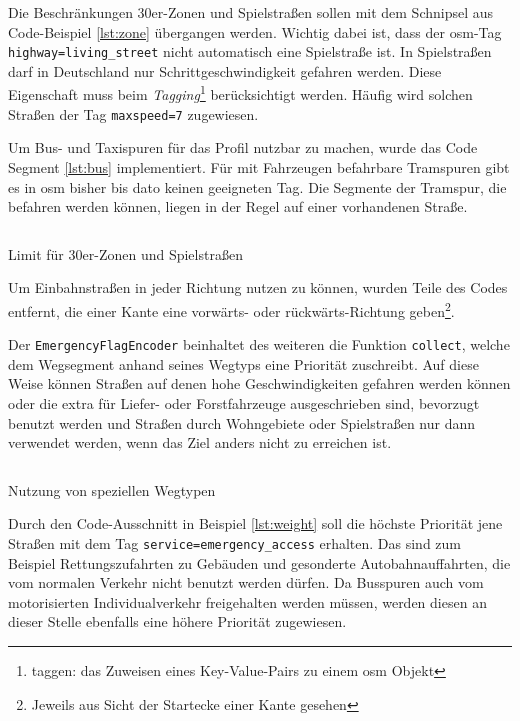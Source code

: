 Die Beschränkungen 30er-Zonen und Spielstraßen sollen mit dem Schnipsel aus Code-Beispiel \ref{lst:zone} übergangen werden.
Wichtig dabei ist, dass der \gls{osm}-Tag \texttt{highway=living\_street} nicht automatisch eine Spielstraße ist.
In Spielstraßen darf in Deutschland nur Schrittgeschwindigkeit gefahren werden.
Diese Eigenschaft muss beim \textit{Tagging}\footnote{taggen: das Zuweisen eines Key-Value-Pairs zu einem \gls{osm} Objekt} berücksichtigt werden.
Häufig wird solchen Straßen der Tag \texttt{maxspeed=7} zugewiesen.


Um Bus- und Taxispuren für das Profil nutzbar zu machen, wurde das Code Segment \ref{lst:bus} implementiert.
Für mit Fahrzeugen befahrbare Tramspuren gibt es in \gls{osm} bisher bis dato keinen geeigneten Tag.
Die Segmente der Tramspur, die befahren werden können, liegen in der Regel auf einer vorhandenen Straße.
\begin{listing}[htb]
\centering
{}
\inputminted[gobble=2, fontsize=\footnotesize, breaklines=true, breakbytoken=|, firstline=299, lastline=303]{java}{../data/JavaFiles/EmergencyFlagEncoder.java}
\caption{Limit für 30er-Zonen und Spielstraßen}
\label{lst:zone}
\end{listing}

Um Einbahnstraßen in jeder Richtung nutzen zu können, wurden Teile des Codes entfernt, die einer Kante eine vorwärts- oder rückwärts-Richtung geben\footnote{Jeweils aus Sicht der Startecke einer Kante gesehen}.

Der \texttt{EmergencyFlagEncoder} beinhaltet des weiteren die Funktion \texttt{collect}, welche dem Wegsegment anhand seines Wegtyps eine Priorität zuschreibt.
Auf diese Weise können Straßen auf denen hohe Geschwindigkeiten gefahren werden können oder die extra für Liefer- oder Forstfahrzeuge ausgeschrieben sind, bevorzugt benutzt werden und Straßen durch Wohngebiete oder Spielstraßen nur dann verwendet werden, wenn das Ziel anders nicht zu erreichen ist.

\begin{listing}[htb]
\centering
{}
\inputminted[gobble=2, fontsize=\footnotesize, breaklines=true, breakbytoken=|, firstline=403, lastline=417]{java}{../data/JavaFiles/EmergencyFlagEncoder.java}
\caption{Nutzung von speziellen Wegtypen}
\label{lst:bus}
\end{listing}

Durch den Code-Ausschnitt in Beispiel \ref{lst:weight} soll die höchste Priorität jene Straßen mit dem Tag \texttt{service=emergency\_access} erhalten.
Das sind zum Beispiel Rettungszufahrten zu Gebäuden und gesonderte Autobahnauffahrten, die vom normalen Verkehr nicht benutzt werden dürfen.
Da Busspuren auch vom motorisierten Individualverkehr freigehalten werden müssen, werden diesen an dieser Stelle ebenfalls eine höhere Priorität zugewiesen.

